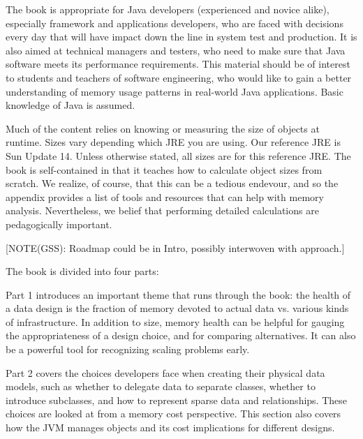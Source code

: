 
The book is appropriate for Java developers (experienced and novice alike),
especially framework and applications developers, who are faced with decisions
every day that will have impact down the line in system test and production. It
is also aimed at technical managers and testers, who need to make sure that Java
software meets its performance requirements.  This material should be of
interest to students and teachers of software engineering, who would like to
gain a better understanding of memory usage patterns in real-world Java
applications. Basic knowledge of Java is assumed.

Much of the content relies on knowing or measuring the size of objects at
runtime. Sizes vary depending which JRE you are using. Our reference JRE is Sun
\javasix Update 14. Unless otherwise stated, all sizes are for this reference
JRE. The book is self-contained in that it teaches how to calculate object sizes
from scratch. We realize, of course, that this can be a tedious endevour, and so
the appendix provides a list of tools and resources that can help with memory
analysis. Nevertheless, we belief that performing detailed calculations are
pedagogically important.

[NOTE(GSS): Roadmap could be in Intro, possibly interwoven with approach.]

The book is divided into four parts:

Part 1 introduces an important theme that runs through the book: the health of a
data design is the fraction of memory devoted to actual data vs. various kinds
of infrastructure. In addition to size, memory health can be helpful for gauging
the appropriateness of a design choice, and for comparing alternatives. It can
also be a powerful tool for recognizing scaling problems early.

Part 2 covers the choices developers face when creating their physical data
models, such as whether to delegate data to separate classes, whether to
introduce subclasses, and how to represent sparse data and relationships. These
choices are looked at from a memory cost perspective. This section also covers
how the JVM manages objects and its cost implications for different designs.
  
